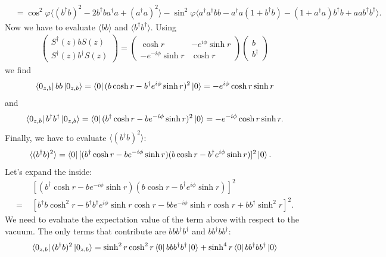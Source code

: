\documentclass{article}
\theoremstyle{definition}
\begin{document}
\begin{enumerate}[label=(\alph*)]
\begin{align*}
&= \cos^2 \varphi \langle  (b^\dagger b)^2 - 2 b^\dagger b a^\dagger a + (a^\dagger a)^2  \rangle 
- \sin^2 \varphi \langle  a^\dagger a^\dagger bb - a^\dagger a (1+b^\dagger b) - (1+a^\dagger a) b^\dagger b + aab^\dagger b^\dagger  \rangle.
\end{align*}
Now we have to evaluate $\langle bb \rangle$ and $\langle b^\dagger b^\dagger \rangle$. Using 
\begin{align*}
\begin{pmatrix}
S^\dagger(z) b S(z) \\ S^\dagger(z) b^\dagger S(z)
\end{pmatrix}
= 
\begin{pmatrix}
\cosh r & -e^{i\phi} \sinh r \\ -e^{-i\phi}\sinh r & \cosh r 
\end{pmatrix}
\begin{pmatrix}
b \\ b^\dagger 
\end{pmatrix}
\end{align*}
we find 
\begin{align*}
\bra{0_{z,b}}  bb    \ket{0_{z,b}}  = \bra{0}  ( b\cosh r - b^\dagger e^{i\phi} \sinh r)^2  \ket{0} = -e^{i\phi}\cosh r \sinh r
\end{align*}
and 
\begin{align*}
\bra{0_{z,b}}  b^\dagger b^\dagger    \ket{0_{z,b}}  = \bra{0}  ( b^\dagger \cosh r - b e^{-i\phi} \sinh r)^2  \ket{0} = -e^{-i\phi}\cosh r \sinh r.
\end{align*}
Finally, we have to evaluate $\langle (b^\dagger b)^2 \rangle$:
\begin{align*}
\langle (b^\dagger b)^2 \rangle 
&= \bra{0} [(b^\dagger \cosh r - b e^{-i\phi} \sinh r)(b\cosh r - b^\dagger e^{i\phi}\sinh r)]^2   \ket{0}.
\end{align*}
Let's expand the inside:
\begin{align*}
 &[(b^\dagger \cosh r - b e^{-i\phi} \sinh r)(b\cosh r - b^\dagger e^{i\phi}\sinh r)]^2 \\
 =\,\,& [ b^\dagger b \cosh^2 r  -b^\dagger b^\dagger e^{i\phi}\sinh r\cosh r - bb e^{-i\phi}\sinh r \cosh r + bb^\dagger \sinh^2 r]^2.
\end{align*}
We need to evaluate the expectation value of the term above with respect to the vacuum. The only terms that contribute are $bbb^\dagger b^\dagger$ and $bb^\dagger b b^\dagger$:
\begin{align*}
\bra{0_{z,b}} (b^\dagger b )^2 \ket{0_{z,b}}
&= \sinh^2 r \cosh^2 r   \bra{0} bbb^\dagger b^\dagger  \ket{0}  + \sinh^4 r \bra{0} bb^\dagger b b^\dagger \ket{0} \\ 

\end{align*}
\end{enumerate}
\end{document}
